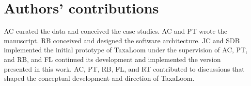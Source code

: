 \documentclass[pdflatex,sn-vancouver-num]{sn-jnl}%
\theoremstyle{thmstyleone}%
\theoremstyle{thmstyletwo}%
\theoremstyle{thmstylethree}%
\begin{document}
\section*{Authors' contributions}

AC curated the data and conceived the case studies. AC and PT wrote the manuscript. RB conceived and designed the software architecture. JC and SDB implemented the initial prototype of TaxaLoom under the supervision of AC, PT, and RB, and FL continued its development and implemented the version presented in this work. AC, PT, RB, FL, and RT contributed to discussions that shaped the conceptual development and direction of TaxaLoom.


\backmatter












\clearpage



\end{document}
